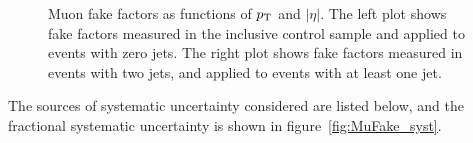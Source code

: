 \begin{figure}
  \caption{Muon fake factors as functions of $p_{\text{T}}$ and $|\eta|$.  The left plot shows fake factors measured in the inclusive control sample and applied to events with zero jets. The right plot shows fake factors measured in events with two jets, and applied to events with at least one jet.}
  \label{fig:MuFake_ff}
\end{figure}


The sources of systematic uncertainty considered are listed below, and the fractional systematic uncertainty is shown in figure~\ref{fig:MuFake_syst}.

